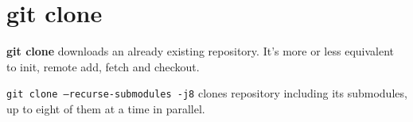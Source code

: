 %

\section{git clone}
\textbf{git clone} downloads an already existing repository.
It's more or less equivalent to init, remote add, fetch and checkout.

\texttt{git clone --recurse-submodules -j8} clones repository including its submodules, up to eight of them at a time in parallel.

%